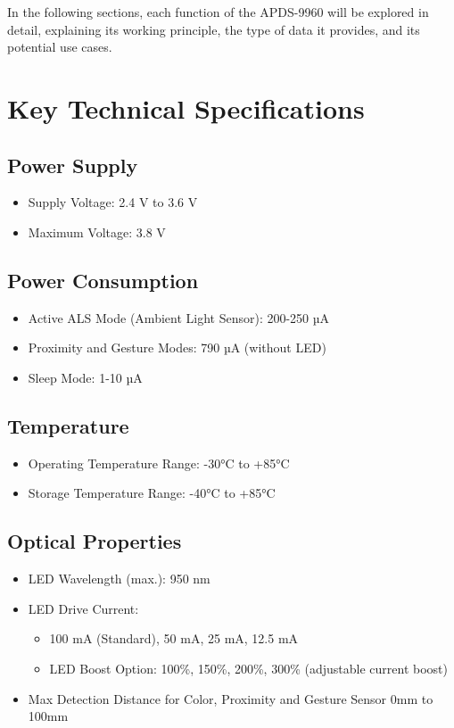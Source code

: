 In the following sections, each function of the APDS-9960 will be explored in detail, explaining its working principle, the type of data it provides, and its potential use cases.





\section{Key Technical Specifications}
\label{chap:Specification}

\subsection*{Power Supply}
\begin{itemize}
	\item Supply Voltage: 2.4 V to 3.6 V
	\item Maximum Voltage: 3.8 V
\end{itemize}

\subsection*{Power Consumption}
\begin{itemize}
	\item Active ALS Mode (Ambient Light Sensor): 200-250 µA
	\item Proximity and Gesture Modes: 790 µA (without LED)
	\item Sleep Mode: 1-10 µA
\end{itemize}

\subsection*{Temperature}
\begin{itemize}
	\item Operating Temperature Range: -30°C to +85°C
	\item Storage Temperature Range: -40°C to +85°C
\end{itemize}

\subsection*{Optical Properties}
\begin{itemize}
	\item LED Wavelength (max.): 950 nm
	\item LED Drive Current:
	\begin{itemize}
		\item 100 mA (Standard), 50 mA, 25 mA, 12.5 mA
		\item LED Boost Option: 100\%, 150\%, 200\%, 300\% (adjustable current boost)
	\end{itemize}
	\item Max Detection Distance for Color, Proximity and Gesture Sensor 0mm to 100mm
\end{itemize}

